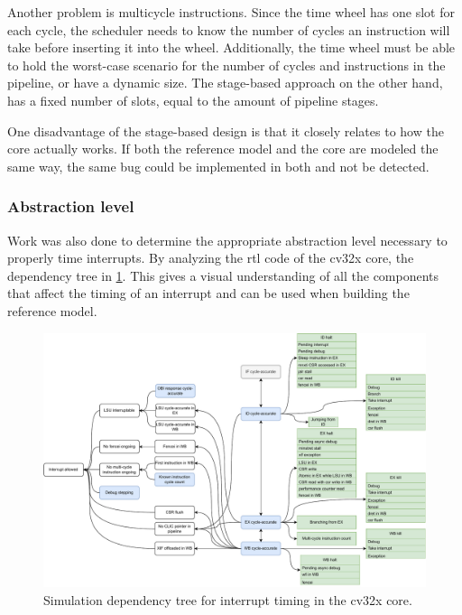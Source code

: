 Another problem is multicycle instructions. Since the time wheel has one slot for each cycle, the scheduler needs to know the number of cycles an instruction will take before inserting it into the wheel. Additionally, the time wheel must be able to hold the worst-case scenario for the number of cycles and instructions in the pipeline, or have a dynamic size. The stage-based approach on the other hand, has a fixed number of slots, equal to the amount of pipeline stages. 

One disadvantage of the stage-based design is that it closely relates to how the core actually works. If both the reference model and the core are modeled the same way, the same bug could be implemented in both and not be detected.


\subsubsection{Abstraction level}

Work was also done to determine the appropriate abstraction level necessary to properly time interrupts. By analyzing the \acrshort{rtl} code of the \gls{cv32x} core, the dependency tree in \cref{fig:dependency-tree-cv32x}. This gives a visual understanding of all the components that affect the timing of an interrupt and can be used when building the reference model.

\begin{figure}[htb]
    \centering
    \includegraphics[width=1.0\linewidth]{figures/Dependencies.pdf}
    \caption{Simulation dependency tree for interrupt timing in the \gls{cv32x} core.}
    \label{fig:dependency-tree-cv32x}
\end{figure}


